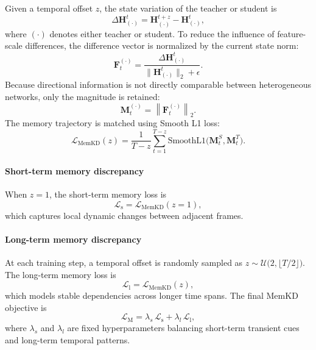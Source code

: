 ﻿\documentclass[lettersize,journal]{IEEEtran}
\begin{document}
Given a temporal offset $z$, the state variation of the teacher or student is
\begin{equation}
\Delta \mathbf{H}^t_{(\cdot)}
= \mathbf{H}^{t+z}_{(\cdot)} - \mathbf{H}^{t}_{(\cdot)},
\end{equation}
where $(\cdot)$ denotes either teacher or student. To reduce the influence of feature-scale differences, the difference vector is normalized by the current state norm:
\begin{equation}
\mathbf{F}^{(\cdot)}_t
= \frac{\Delta \mathbf{H}^t_{(\cdot)}}
{\|\mathbf{H}^t_{(\cdot)}\|_2 + \epsilon}.
\end{equation}
Because directional information is not directly comparable between heterogeneous networks, only the magnitude is retained:
\begin{equation}
\mathbf{M}^{(\cdot)}_t
= \left\|
\mathbf{F}^{(\cdot)}_t
\right\|_2.
\end{equation}
The memory trajectory is matched using Smooth L1 loss:
\begin{equation}
\mathcal{L}_{\mathrm{MemKD}}(z)
=
\frac{1}{T-z}
\sum_{t=1}^{T-z}
\mathrm{SmoothL1}
\Big(
\mathbf{M}^{S}_t,
\mathbf{M}^{T}_t
\Big).
\end{equation}

\paragraph{Short-term memory discrepancy}
When $z=1$, the short-term memory loss is
\begin{equation}
    \mathcal{L}_{\mathrm{s}}=\mathcal{L}_{\mathrm{MemKD}}(z=1),
\end{equation}
which captures local dynamic changes between adjacent frames.

\paragraph{Long-term memory discrepancy}
At each training step, a temporal offset is randomly sampled as
\(
z \sim \mathcal{U}\big(2,\lfloor T/2 \rfloor\big)
\).
The long-term memory loss is
\begin{equation}
    \mathcal{L}_{\mathrm{l}}=\mathcal{L}_{\mathrm{MemKD}}(z),
\end{equation}
which models stable dependencies across longer time spans. The final MemKD objective is
\begin{equation}
\mathcal{L}_{\mathrm{M}}
=
\lambda_s\, \mathcal{L}_{\mathrm{s}}
+
\lambda_l\, \mathcal{L}_{\mathrm{l}},
\end{equation}
where $\lambda_s$ and $\lambda_l$ are fixed hyperparameters balancing short-term transient cues and long-term temporal patterns.
\end{document}
